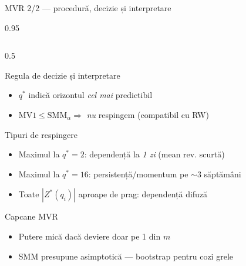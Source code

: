 \documentclass[9pt, aspectratio=169, t]{beamer}
\begin{document}
\begin{frame}[shrink=22]{MVR 2/2 --- procedură, decizie și interpretare}
\begin{cminipage}{0.95\textwidth}
\begin{columns}[T]
\begin{column}{0.5\textwidth}
\begin{exampleblock}{Regula de decizie și interpretare}
\begin{itemize}
    \item $q^*$ indică orizontul \emph{cel mai} predictibil
    \item $\mathrm{MV1} \leq \mathrm{SMM}_\alpha \Rightarrow$ \emph{nu} respingem (compatibil cu RW)
\end{itemize}
\end{exampleblock}
\begin{exampleblock}{Tipuri de respingere}
\footnotesize
\begin{itemize}\setlength{\itemsep}{0pt}
    \item Maximul la $q^* = 2$: dependență la \emph{1 zi} (mean rev. scurtă)
    \item Maximul la $q^* = 16$: persistență/momentum pe $\sim 3$ săptămâni
    \item Toate $|Z^*(q_i)|$ aproape de prag: dependență difuză
\end{itemize}
\end{exampleblock}
\begin{alertblock}{Capcane MVR}
\footnotesize
\begin{itemize}\setlength{\itemsep}{0pt}
    \item Putere mică dacă deviere doar pe 1 din $m$
    \item SMM presupune asimptotică --- bootstrap pentru cozi grele
\end{itemize}
\end{alertblock}
\end{column}
\end{columns}
\end{cminipage}
\end{frame}
\end{document}
